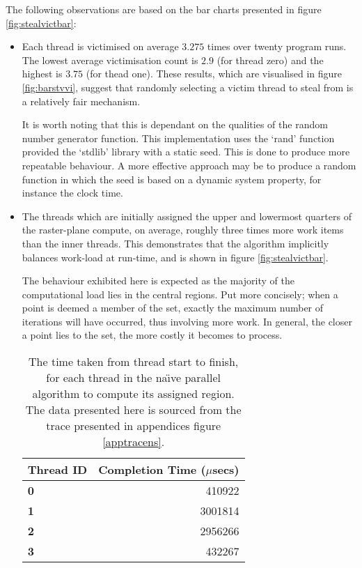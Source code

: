 

The following observations are based on the bar charts presented in figure \ref{fig:stealvictbar}:

\begin{itemize}
\item 
    Each thread is victimised on average \(3.275\) times over twenty program runs. 
    The lowest average victimisation count is \(2.9\) (for thread zero) and the highest is \(3.75\) (for thead one).
    These results, which are visualised in figure \ref{fig:barstvvi}, suggest that randomly selecting a victim 
    thread to steal from is a relatively fair mechanism.

    It is worth noting that this is dependant on the qualities of the random number generator function.
    This implementation uses the `rand' function provided the `stdlib' library with a static seed. This is done to 
    produce more repeatable behaviour. 
    A more effective approach may be to produce a random function in which the seed is based on a dynamic system property,
    for instance the clock time. 

\item 
    The threads which are initially assigned the upper and lowermost quarters of the raster-plane compute, on average, roughly three times 
    more work items than the inner threads. 
    This demonstrates that the algorithm implicitly balances work-load at run-time, and is shown in figure \ref{fig:stealvictbar}.
    
    The behaviour exhibited here is expected as the majority of the computational load lies in the central regions. 
    Put more concisely; when a point is deemed a member of the set, exactly the maximum number of iterations will have occurred, thus 
    involving more work. In general, the closer a point lies to the set, the more costly it becomes to process.

\begin{table}[H]
    \centering
    \begin{tabular}{|l|r|}
        \hline
            \textbf{Thread ID} & \textbf{Completion Time} (\(\mu\)secs) \\
        \hline \hline
            \textbf{0} & 410922 \\
            \hline
            \textbf{1} & 3001814 \\
            \textbf{2} & 2956266 \\
            \hline
            \textbf{3} & 432267 \\
            \hline
    \end{tabular}
    \label{tab:npartab}
    \caption{The time taken from thread start to finish, for each thread in the na\"{\i}ve parallel algorithm to compute its assigned region.
The data presented here is sourced from the trace presented in appendices figure \ref{apptracens}.}
\end{table}


\end{itemize}
